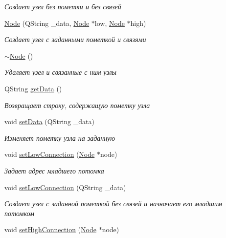 \begin{DoxyCompactItemize}
\begin{DoxyCompactList}\small\item\em Создает узел без пометки и без связей \end{DoxyCompactList}\item 
\hyperlink{class_node_a184f393e8d61eea5e10fd6794cbd9c8d}{Node} (Q\+String \+\_\+data, \hyperlink{class_node}{Node} $\ast$low, \hyperlink{class_node}{Node} $\ast$high)
\begin{DoxyCompactList}\small\item\em Создает узел с заданными пометкой и связями \end{DoxyCompactList}\item 
\hyperlink{class_node_aa0840c3cb5c7159be6d992adecd2097c}{$\sim$\+Node} ()
\begin{DoxyCompactList}\small\item\em Удаляет узел и связанные с ним узлы \end{DoxyCompactList}\item 
Q\+String \hyperlink{class_node_ab3be314a19ff6049d0ab528ef3122139}{get\+Data} ()
\begin{DoxyCompactList}\small\item\em Возвращает строку, содержащую пометку узла \end{DoxyCompactList}\item 
void \hyperlink{class_node_a4ec7f6f38e67963aed6759a782db25a1}{set\+Data} (Q\+String \+\_\+data)
\begin{DoxyCompactList}\small\item\em Изменяет пометку узла на заданную \end{DoxyCompactList}\item 
void \hyperlink{class_node_afd304ef1773b4ee5e75e826c4b7b57b0}{set\+Low\+Connection} (\hyperlink{class_node}{Node} $\ast$node)
\begin{DoxyCompactList}\small\item\em Задает адрес младшего потомка \end{DoxyCompactList}\item 
void \hyperlink{class_node_ab8a35e02d194a5f378120db368a22ded}{set\+Low\+Connection} (Q\+String \+\_\+data)
\begin{DoxyCompactList}\small\item\em Создает узел с заданной пометкой без связей и назначает его младшим потомком \end{DoxyCompactList}\item 
void \hyperlink{class_node_a77ee961e6ac046ecc4f52e2cea94ad19}{set\+High\+Connection} (\hyperlink{class_node}{Node} $\ast$node)

\end{DoxyCompactItemize}
